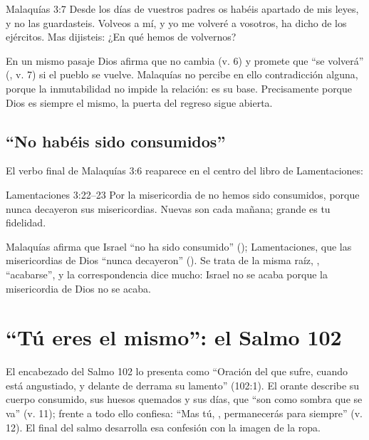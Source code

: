 \begin{verso}{Malaquías 3:7}
Desde los días de vuestros padres os habéis apartado de mis leyes, y no las guardasteis. Volveos a mí, y yo me volveré a vosotros, ha dicho \SENOR{} de los ejércitos. Mas dijisteis: ¿En qué hemos de volvernos?
\end{verso}

En un mismo pasaje Dios afirma que no cambia (v. 6) y promete que ``se volverá'' (, v. 7) si el pueblo se vuelve. Malaquías no percibe en ello contradicción alguna, porque la inmutabilidad no impide la relación: es su base. Precisamente porque Dios es siempre el mismo, la puerta del regreso sigue abierta.

\subsection{“No habéis sido consumidos”}
El verbo final de Malaquías 3:6 reaparece en el centro del libro de Lamentaciones:

\begin{verso}{Lamentaciones 3:22–23}
Por la misericordia de \SENOR{} no hemos sido consumidos, porque nunca decayeron sus misericordias. Nuevas son cada mañana; grande es tu fidelidad.
\end{verso}

Malaquías afirma que Israel ``no ha sido consumido'' (); Lamentaciones, que las misericordias de Dios ``nunca decayeron'' (). Se trata de la misma raíz, , ``acabarse'', y la correspondencia dice mucho: Israel no se acaba porque la misericordia de Dios no se acaba.


\section{“Tú eres el mismo”: el Salmo 102}

El encabezado del Salmo 102 lo presenta como ``Oración del que sufre, cuando está angustiado, y delante de \SENOR{} derrama su lamento'' (102:1). El orante describe su cuerpo consumido, sus huesos quemados y sus días, que ``son como sombra que se va'' (v. 11); frente a todo ello confiesa: ``Mas tú, \SENOR, permanecerás para siempre'' (v. 12). El final del salmo desarrolla esa confesión con la imagen de la ropa.

